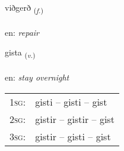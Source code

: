 \documentclass[frontgrid, backgrid]{flacards}\usepackage[]{graphicx}\usepackage[]{xcolor}
\begin{document}
\renewcommand{\flhead}{\vskip5pt \fboxsep=0pt {\small\bfseries\footnotesize Nafnorð | Noun}}
\renewcommand{\fcfoot}{\vskip5pt \fboxsep=0pt \hspace{2pt}{\small\bfseries\footnotesize 3K}}

\renewcommand{\blhead}{\vskip5pt {\small\bfseries\footnotesize Nafnorð | Noun }}
\renewcommand{\bcfoot}{\vskip5pt \hspace{2pt}{\small\bfseries\footnotesize 3K}}


{viðgerð \small{\textsubscript{(\textit{f.})}} \\[1ex] %
\textphonetic{[vɪðcɛrð]} \\
en: \emph{repair} \\  [2ex]
\renewcommand*{\arraystretch}{0.8}
}

\renewcommand{\flhead}{\vskip5pt \fboxsep=0pt {\small\bfseries\footnotesize Sagnorð | Verb}}
\renewcommand{\fcfoot}{\vskip5pt \fboxsep=0pt \hspace{2pt}{\small\bfseries\footnotesize 3K}}

\renewcommand{\blhead}{\vskip5pt {\small\bfseries\footnotesize Sagnorð | Verb }}
\renewcommand{\bcfoot}{\vskip5pt \hspace{2pt}{\small\bfseries\footnotesize 3K}}


{gista \small{\textsubscript{(\textit{v.})}} \\[1ex] %
\textphonetic{[cɪsta]} \\
en: \emph{stay overnight} \\  [2ex]
\renewcommand*{\arraystretch}{0.8}
\begin{tabular}{p{1cm}l}
\textsc{1sg}: & gisti -- gisti -- gist \\ 
\textsc{2sg}: & gistir -- gistir -- gist \\ 
\textsc{3sg}: & gistir -- gisti -- gist \\ 
\end{tabular}
}
\end{document}
